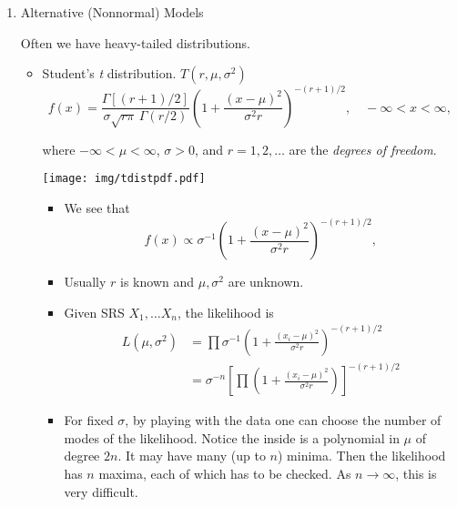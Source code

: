 \documentclass[11pt,english]{scrbook}
\begin{document}
\begin{enumerate}
\item Alternative (Nonnormal) Models
\label{sec:orgc6773e9}

Often we have heavy-tailed distributions.

\begin{itemize}
\item Student's \emph{t} distribution.  \(T(r,\mu,\sigma^2)\)
\begin{equation}
f(x)=\frac{\Gamma\left[(r+1)/2\right]}{\sigma\sqrt{r\pi}\,\Gamma(r/2)}\left(1+\frac{(x - \mu)^{2}}{\sigma^{2}r}\right)^{-(r+1)/2},\quad-\infty<x<\infty,
\end{equation}

where \(-\infty < \mu < \infty\), \(\sigma > 0\), and \(r = 1, 2,\ldots\) are the \emph{degrees of freedom}.
\begin{center}
\begin{center}
\texttt{[image: img/tdistpdf.pdf]}
\end{center}

\end{center}
\begin{itemize}
\item We see that 
\begin{equation}
f(x) \propto \sigma^{-1}\left(1+\frac{(x - \mu)^{2}}{\sigma^{2}r}\right)^{-(r+1)/2},
\end{equation}

\item Usually \(r\) is known and \(\mu,\sigma^{2}\) are unknown.

\item Given SRS  \(X_{1},\ldots X_{n}\), the likelihood is
\begin{align*}
L(\mu,\sigma^{2}) & = \prod \sigma^{-1}\left(1+\frac{(x_{i} - \mu)^{2}}{\sigma^{2}r}\right)^{-(r+1)/2}\\
& =  \sigma^{-n} \left[\prod \left(1+\frac{(x_{i} - \mu)^{2}}{\sigma^{2}r}\right) \right]^{-(r+1)/2}
\end{align*}

\item For fixed \(\sigma\), by playing with the data one can choose the number of modes of the likelihood.  Notice the inside is a polynomial in \(\mu\) of degree \(2n\).  It may have many (up to \(n\)) minima.  Then the likelihood has \(n\) maxima, each of which has to be checked.  As \(n \to \infty\), this is very difficult.
\end{itemize}
\end{itemize}



\end{enumerate}
\end{document}
